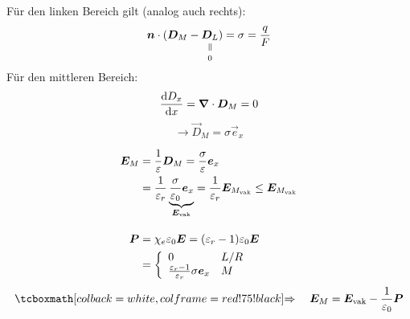 Für den linken Bereich gilt (analog auch rechts):
\begin{equation*}
\vec{n} \cdot (\vec{D}_M - \equalto{\vec{D}_L}{0}) = \sigma = \frac{q}{F}
\end{equation*}
Für den mittleren Bereich:
\begin{equation*}
\prd{D_x}{x} = \vabla \cdot \vec{D}_M = 0 %
\end{equation*}
\begin{equation*}
\rightarrow \vec{D}_M = \sigma \vec{e}_x
\end{equation*}
\begin{minipage}{.5\linewidth}
	\begin{align*}
	\bm{E}_M &= \frac{1}{\varepsilon} \bm{D}_M = \frac{\sigma}{\varepsilon} \bm{e}_x\\
	&= \frac{1}{\varepsilon_r} \underbrace{\frac{\sigma}{\varepsilon_0} \bm{e}_x}_{\bm{E}_{\textrm{vak}}} = \frac{1}{\varepsilon_r} \bm{E}_{M_{\textrm{vak}}} \le \bm{E}_{M_{\textrm{vak}}}\\[10pt]
	\bm{P} &= \chi_e \varepsilon_0 \bm{E} = (\varepsilon_r - 1) \varepsilon_0 \bm{E}\\
	&= \left\{ \begin{array}{ll} {0} & {L/R} \\ {\frac{\varepsilon_r - 1}{\varepsilon_r}\sigma \bm{e}_x} & {M} \end{array} \right.
	\end{align*}
	\begin{equation*}
	\rmbox{\Rightarrow \quad \vec{E}_M = \vec{E}_{\tx{vak}} - \frac{1}{\epsilon_0} \vec{P}}
	\end{equation*}
\end{minipage}%

